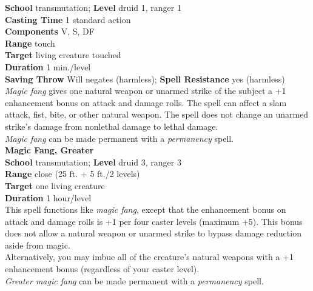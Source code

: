 \textbf{School} transmutation; \textbf{Level} druid 1, ranger 1\\
\textbf{Casting Time} 1 standard action\\
\textbf{Components} V, S, DF\\
\textbf{Range} touch\\
\textbf{Target} living creature touched\\
\textbf{Duration} 1 min./level\\
\textbf{Saving Throw }Will negates (harmless); \textbf{Spell Resistance} yes (harmless)\\
\textit{Magic fang }gives one natural weapon or unarmed strike of the subject a +1 enhancement bonus on attack and damage rolls. The spell can affect a slam attack, fist, bite, or other natural weapon. The spell does not change an unarmed strike's damage from nonlethal damage to lethal damage.\\
\textit{Magic fang }can be made permanent with a \textit{permanency }spell.\\
\textbf{Magic Fang, Greater}\\
\textbf{School} transmutation; \textbf{Level} druid 3, ranger 3\\
\textbf{Range} close (25 ft. + 5 ft./2 levels)\\
\textbf{Target} one living creature\\
\textbf{Duration} 1 hour/level\\
This spell functions like \textit{magic fang}, except that the enhancement bonus on attack and damage rolls is +1 per four caster levels (maximum +5). This bonus does not allow a natural weapon or unarmed strike to bypass damage reduction aside from magic.\\
Alternatively, you may imbue all of the creature's natural weapons with a +1 enhancement bonus (regardless of your caster level).\\
\textit{Greater magic fang }can be made permanent with a \textit{permanency }spell.\\
